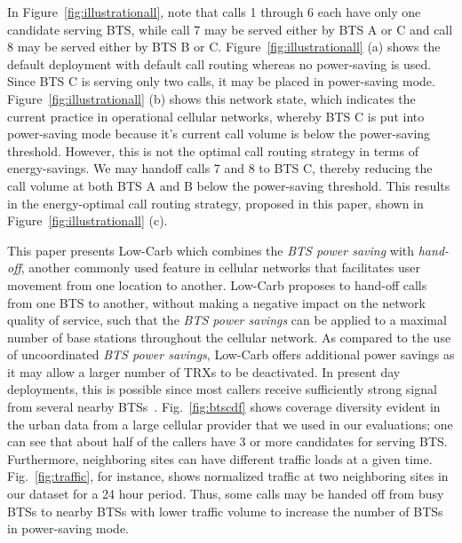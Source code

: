 In Figure~\ref{fig:illustrationall}, note that calls 1 through 6 each have only one candidate serving BTS, while call 7 may be served either by BTS A or C and call 8 may be served either by BTS B or C. Figure~\ref{fig:illustrationall} (a) shows the default deployment with default call routing whereas no power-saving is used. Since BTS C is serving only two calls, it may be placed in power-saving mode. Figure~\ref{fig:illustrationall} (b) shows this network state, which indicates the current practice in operational cellular networks, whereby BTS C is put into power-saving mode because it's current call volume is below the power-saving threshold. However, this is not the optimal call routing strategy in terms of energy-savings. We may handoff calls 7 and 8 to BTS C, thereby reducing the call volume at both BTS A and B below the power-saving threshold. This results in the energy-optimal call routing strategy, proposed in this paper, shown in Figure~\ref{fig:illustrationall} (c). 


This paper presents Low-Carb which combines the \textit{BTS
power saving} with \textit{hand-off}, another commonly used
feature in cellular networks that facilitates user movement
from one location to another. Low-Carb proposes to hand-off
calls from one BTS to another, without making a negative impact
on the network quality of service, such that the \textit{BTS
power savings} can be applied to a maximal number of base
stations throughout the cellular network. As compared to the
use of uncoordinated \textit{BTS power savings}, Low-Carb
offers additional power savings as it may allow a larger number
of TRXs to be deactivated. 
In present day deployments, this is possible since most callers
receive sufficiently strong signal from several nearby
BTSs~\cite{Peng:2011:BTSSaving:Mobicom}. Fig.~\ref{fig:btscdf}
shows coverage diversity evident in the urban data from a large
cellular provider that we used in our evaluations; one can see
that about half of the callers have 3 or more candidates for
serving BTS. Furthermore, neighboring sites can have different traffic loads at a given time. Fig.~\ref{fig:traffic}, for instance, shows normalized traffic at two neighboring sites in our dataset for a 24 hour period. Thus, some calls may be handed off from busy BTSs to nearby BTSs with lower traffic volume to increase the number of BTSs in power-saving mode.

